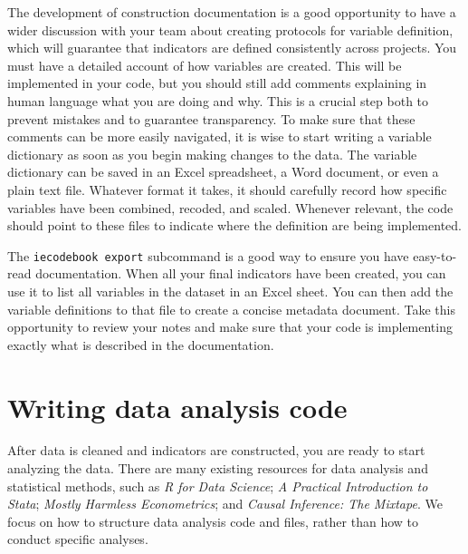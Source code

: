 The development of construction documentation is a good opportunity to have
a wider discussion with your team about creating protocols for variable definition,
which will guarantee that indicators are defined consistently across projects.
You must have a detailed account of how variables are created.
This will be implemented in your code, but you should still
add comments explaining in human language what you are doing and why.
This is a crucial step both to prevent mistakes and to guarantee transparency.
To make sure that these comments can be more easily navigated,
it is wise to start writing a variable dictionary as soon as you begin making changes to the data.
The variable dictionary can be saved in an Excel spreadsheet,
a Word document, or even a plain text file.
Whatever format it takes,
it should carefully record how specific variables have been combined, recoded, and scaled.
Whenever relevant, the code should point to these files to indicate
where the definition are being implemented.

The \texttt{iecodebook export} subcommand is
a good way to ensure you have easy-to-read documentation.
When all your final indicators have been created,
you can use it to list all variables in the dataset in an Excel sheet.
You can then add the variable definitions to that file to create a concise metadata document.
Take this opportunity to review your notes and make sure that your code
is implementing exactly what is described in the documentation.


\section{Writing data analysis code}

After data is cleaned and indicators are constructed, you are ready to start analyzing the data.
There are many existing resources for data analysis and statistical methods, such as
\textit{R for Data Science};
\textit{A Practical Introduction to Stata};
\textit{Mostly Harmless Econometrics};
and \textit{Causal Inference: The Mixtape}.
We focus on how to structure data analysis code and files, rather than how to conduct specific analyses.

